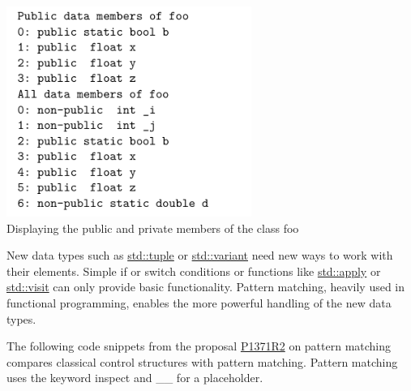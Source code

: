 \begin{center}
\includegraphics[width=0.6\textwidth]{content/5/chapter8/images/8.png}\\
Displaying the public and private members of the class foo
\end{center}


New data types such as \href{https://en.cppreference.com/w/cpp/utility/tuple}{std::tuple} or \href{https://en.cppreference.com/w/cpp/utility/variant}{std::variant} need new ways to work with their elements. Simple if or switch conditions or functions like \href{https://en.cppreference.com/w/cpp/utility/apply}{std::apply} or \href{https://en.cppreference.com/w/cpp/utility/variant/visit}{std::visit} can only provide basic functionality. Pattern matching, heavily used in functional programming, enables the more powerful handling of the new data types.

The following code snippets from the proposal \href{http://www.open-std.org/jtc1/sc22/wg21/docs/papers/2020/p1371r2.pdf}{P1371R2} on pattern matching compares classical control structures with pattern matching. Pattern matching uses the keyword inspect and \_\_ for a placeholder.

